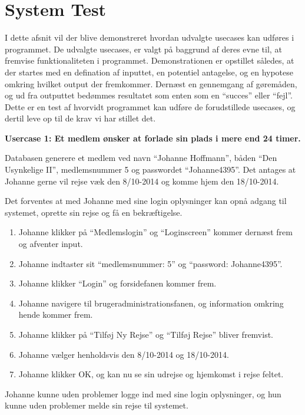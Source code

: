\section{System Test}

I dette afsnit vil der blive demonstreret hvordan udvalgte usecases kan udføres i programmet. De udvalgte usecases, er valgt på baggrund af deres evne til, at fremvise funktionaliteten i programmet. Demonstrationen er opstillet således, at der startes med en defination af inputtet, en potentiel antagelse, og en hypotese omkring hvilket output der fremkommer. Dernæst en gennemgang af gøremåden, og ud fra outputtet bedømmes resultatet som enten som en \enquote{succes} eller \enquote{fejl}. Dette er en test af hvorvidt programmet kan udføre de forudstillede usecases, og dertil leve op til de krav vi har stillet det.

\textbf{Usercase 1: Et medlem ønsker at forlade sin plads i mere end 24 timer.}

Databasen generere et medlem ved navn \enquote{Johanne Hoffmann}, båden \enquote{Den Usynkelige II}, medlemsnummer 5 og passwordet \enquote{Johanne4395}. Det antages at Johanne gerne vil rejse væk den 8/10-2014 og komme hjem den 18/10-2014.

Det forventes at med Johanne med sine login oplysninger kan opnå adgang til systemet, oprette sin rejse og få en bekræftigelse.

\begin{enumerate}
	\item Johanne klikker på \enquote{Medlemslogin} og \enquote{Loginscreen} kommer dernæst frem og afventer input.
	\item Johanne indtaster sit \enquote{medlemsnummer: 5} og \enquote{password: Johanne4395}.
	\item Johanne klikker \enquote{Login} og forsidefanen kommer frem.
	\item Johanne navigere til brugeradministrationsfanen, og information omkring hende kommer frem.
	\item Johanne klikker på \enquote{Tilføj Ny Rejse} og \enquote{Tilføj Rejse} bliver fremvist.
	\item Johanne vælger henholdsvis den 8/10-2014 og 18/10-2014.
	\item Johanne klikker OK, og kan nu se sin udrejse og hjemkomst i rejse feltet.
\end{enumerate}

Johanne kunne uden problemer logge ind med sine login oplysninger, og hun kunne uden problemer melde sin rejse til systemet.

